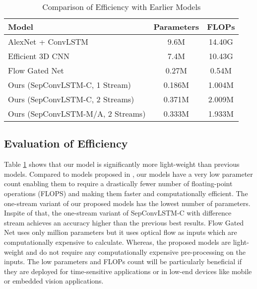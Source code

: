 \documentclass[conference]{IEEEtran}
\begin{document}
\begin{table}[t]
\caption{Comparison of Efficiency with Earlier Models}
\begin{center}
\begin{tabular}{lcc}
\hline
\textbf{Model}                & \textbf{Parameters} & \textbf{FLOPs} \\ \hline
AlexNet + ConvLSTM \cite{sudhakaran2017learning}                       & 9.6M           & 14.40G     \\
Efficient 3D CNN \cite{li2019efficient}               & 7.4M           & 10.43G    \\
Flow Gated Net \cite{cheng2019rwf}                & 0.27M           & 0.54M   \\
Ours (SepConvLSTM-C, 1 Stream)  & 0.186M        &  1.004M         \\
Ours (SepConvLSTM-C, 2 Streams) & 0.371M     &  2.009M              \\ 
Ours (SepConvLSTM-M/A, 2 Streams) & 0.333M     &  1.933M               \\ \hline
\end{tabular}
\end{center}
\label{table:efficiency}
\end{table}



\subsection{Evaluation of Efficiency}

Table \ref{table:efficiency} shows that our model is significantly more light-weight than previous models. Compared to models proposed in \cite{sudhakaran2017learning} \cite{li2019efficient}, our models have a very low parameter count enabling them to require a drastically fewer number of floating-point operations (FLOPS) and making them faster and computationally efficient. The one-stream variant of our proposed models has the lowest number of parameters. Inspite of that, the one-stream variant of SepConvLSTM-C with difference stream achieves an accuracy higher than the previous best results. Flow Gated Net \cite{cheng2019rwf} uses only  million parameters but it uses optical flow as inputs which are computationally expensive to calculate. Whereas, the proposed models are light-weight and do not require any computationally expensive pre-processing on the inputs. The low parameters and FLOPs count will be particularly beneficial if they are deployed for time-sensitive applications or in low-end devices like mobile or embedded vision applications. 
\end{document}
